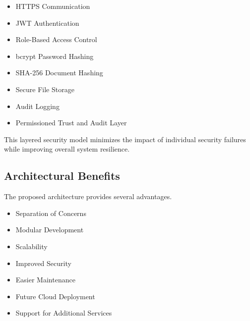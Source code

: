 \begin{itemize}

\item HTTPS Communication

\item JWT Authentication

\item Role-Based Access Control

\item bcrypt Password Hashing

\item SHA-256 Document Hashing

\item Secure File Storage

\item Audit Logging

\item Permissioned Trust and Audit Layer

\end{itemize}

This layered security model minimizes the impact of individual security failures while improving overall system resilience.


\subsection{Architectural Benefits}

The proposed architecture provides several advantages.

\begin{itemize}

\item Separation of Concerns

\item Modular Development

\item Scalability

\item Improved Security

\item Easier Maintenance

\item Future Cloud Deployment

\item Support for Additional Services

\end{itemize}